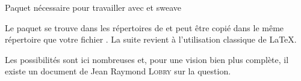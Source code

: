 \begin{codesimple}{Paquet nécessaire pour travailler avec  et }{sweave}
\usepackage{Sweave}
\end{codesimple}


Le paquet  se trouve dans les répertoires de  et peut être copié dans le même répertoire que votre fichier . La suite revient à l'utilisation classique de \LaTeX.

Les possibilités sont ici nombreuses et, pour une vision bien plus complète, il existe un document de Jean Raymond \textsc{Lobry}\cite{lobr} sur la question.
